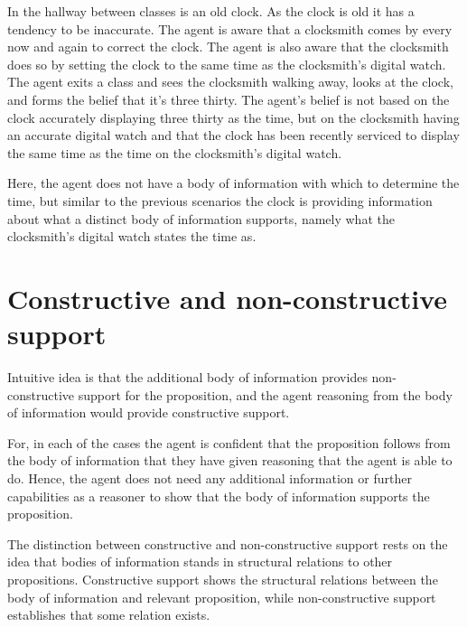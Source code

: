 \documentclass[10pt]{article}
\begin{document}
\begin{scenario}[Clocksmith]
  In the hallway between classes is an old clock.
  As the clock is old it has a tendency to be inaccurate.
  The agent is aware that a clocksmith comes by every now and again to correct the clock.
  The agent is also aware that the clocksmith does so by setting the clock to the same time as the clocksmith's digital watch.
  The agent exits a class and sees the clocksmith walking away, looks at the clock, and forms the belief that it's three thirty.
  The agent's belief is not based on the clock accurately displaying three thirty as the time, but on the clocksmith having an accurate digital watch and that the clock has been recently serviced to display the same time as the time on the clocksmith's digital watch.
\end{scenario}

Here, the agent does not have a body of information with which to determine the time, but similar to the previous scenarios the clock is providing information about what a distinct body of information supports, namely what the clocksmith's digital watch states the time as.

\section{Constructive and non-constructive support}
\label{sec:constr-non-constr}

Intuitive idea is that the additional body of information provides non-constructive support for the proposition, and the agent reasoning from the body of information would provide constructive support.

For, in each of the cases the agent is confident that the proposition follows from the body of information that they have given reasoning that the agent is able to do.
Hence, the agent does not need any additional information or further capabilities as a reasoner to show that the body of information supports the proposition.

The distinction between constructive and non-constructive support rests on the idea that bodies of information stands in structural relations to other propositions.
Constructive support shows the structural relations between the body of information and relevant proposition, while non-constructive support establishes that some relation exists.

\end{document}
